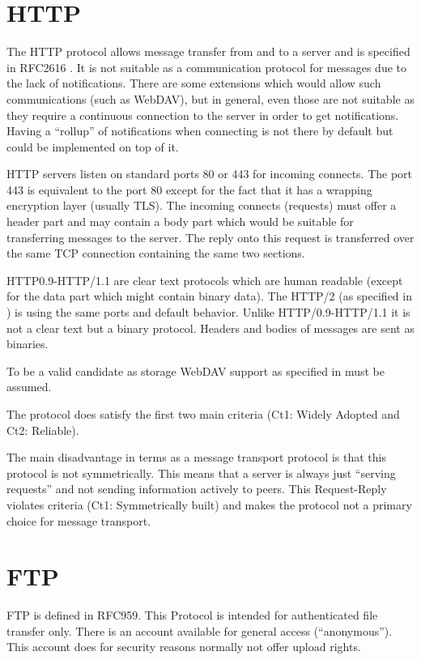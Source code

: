 \documentclass[a4paper,appendixprefix,pdfusetitle,twocolumn,fontsize=8pt,draft,DIV=calc]{scrbook}
\begin{document}
\section{HTTP}
The HTTP protocol allows message transfer from and to a server and is specified in RFC2616 \cite{RFC2616}. It is not suitable as a communication protocol for messages due to the lack of notifications. There are some extensions which would allow such communications (such as WebDAV), but in general, even those are not suitable as they require a continuous connection to the server in order to get notifications. Having a ``rollup'' of notifications when connecting is not there by default but could be implemented on top of it. 

HTTP servers listen on standard ports 80 or 443 for incoming connects. The port 443 is equivalent to the port 80 except for the fact that it has a wrapping encryption layer (usually TLS). The incoming connects (requests) must offer a header part and may contain a body part which would be suitable for transferring messages to the server. The reply onto this request is transferred over the same TCP connection containing the same two sections.

HTTP0.9-HTTP/1.1 are clear text protocols which are human readable (except for the data part which might contain binary data). The HTTP/2 (as specified in \cite{RFC7540}) is using the same ports and default behavior. Unlike HTTP/0.9-HTTP/1.1 it is not a clear text but a binary protocol. Headers and bodies of messages are sent as binaries. 

To be a valid candidate as storage WebDAV support as specified in \cite{rfc4918} must be assumed.

The protocol does satisfy the first two main criteria (Ct1: Widely Adopted and Ct2: Reliable).

The main disadvantage in terms as a message transport protocol is that this protocol is not symmetrically. This means that a server is always just ``serving requests'' and not sending information actively to peers. This Request-Reply violates criteria (Ct1: Symmetrically built) and makes the protocol not a primary choice for message transport. 

\section{FTP}
FTP is defined in RFC959\cite{RFC959}. This Protocol is intended for authenticated file transfer only. There is an account available for general access (``anonymous''). This account does for security reasons normally not offer upload rights.
\end{document}
